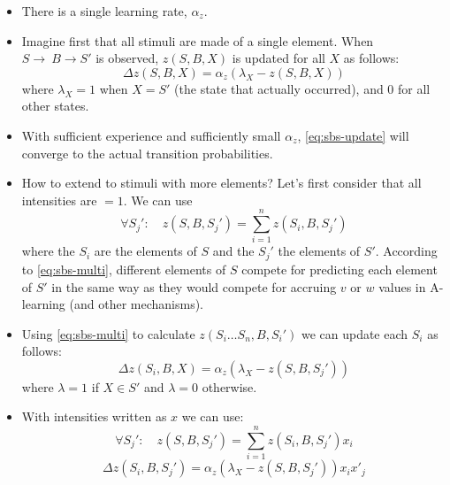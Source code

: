 \documentclass[11pt]{article}
\begin{document}
\begin{itemize}
\item There is a single learning rate, \(\alpha_z\).

\item Imagine first that all stimuli are made of a single element. When
\(S\to\ B\to S'\) is observed, \(z(S,B,X)\) is updated for all
\(X\) as follows:
\begin{equation}
  \label{eq:sbs-update}
  \Delta z(S,B,X) = \alpha_z \left( \lambda_{X} - z(S,B,X) \right)
\end{equation}
where \(\lambda_{X}=1\) when \(X=S'\) (the state that actually
occurred), and 0 for all other states.

\item With sufficient experience and sufficiently small \(\alpha_z\),
\cref{eq:sbs-update} will converge to the actual transition
probabilities.

\item How to extend to stimuli with more elements? Let's first consider
that all intensities are \(=1\). We can use
\begin{equation}
  \label{eq:sbs-multi}
  \forall S_j': \quad z(S,B,S_j') = \sum_{i=1}^n z(S_i,B,S_j')
\end{equation}
where the \(S_i\) are the elements of \(S\) and the \(S_j'\) the elements
of \(S'\). According to \cref{eq:sbs-multi}, different elements of \(S\)
compete for predicting each element of \(S'\) in the same way as they
would compete for accruing \(v\) or \(w\) values in A-learning (and
other mechanisms).

\item Using \cref{eq:sbs-multi} to calculate \(z(S_i\ldots S_n,B,S_i')\) we can
update each \(S_i\) as follows:
\begin{equation}
  \label{eq:sbs-update}
  \Delta z(S_i,B,X) = \alpha_z \left( \lambda_X - z(S,B,S_j') \right)
\end{equation}
where \(\lambda=1\) if \(X\in S'\) and \(\lambda=0\) otherwise.

\item With intensities written as \(x\) we can use:
\begin{equation}
  \label{eq:sbs-multi-intensity}
  \forall S_j': \quad z(S,B,S_j') = \sum_{i=1}^n z(S_i,B,S_j')x_i
\end{equation}
\begin{equation}
  \label{eq:sbs-update-intensity}
  \Delta z(S_i,B,S_j') = \alpha_z \left( \lambda_X - z(S,B,S_j') \right) x_i x'_j
\end{equation}
\end{itemize}
\end{document}
